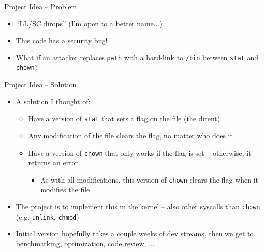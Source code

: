 \documentclass[aspectratio=169]{beamer}
\begin{document}
\begin{frame}[fragile]{Project Idea -- Problem}
	\begin{itemize}
		\item ``LL/SC dirops'' (I'm open to a better name...)
	\end{itemize}

	\begin{example}
		\begin{semiverbatim}
			
		\end{semiverbatim}
	\end{example}

	\begin{itemize}
		\pause
		\item This code has a security bug!
		      \pause
		\item What if an attacker replaces \texttt{path} with a hard-link to \texttt{/bin} between \texttt{stat} and \texttt{chown}?
	\end{itemize}
\end{frame}

\begin{frame}{Project Idea -- Solution}
	\begin{itemize}
		\item A solution I thought of:
		      \begin{itemize}
			      \item Have a version of \texttt{stat} that sets a flag on the file (the dirent)
			      \item Any modification of the file clears the flag, no matter who does it
			      \item Have a version of \texttt{chown} that only works if the flag is set -- otherwise, it returns an error
			            \begin{itemize}
				            \item As with all modifications, this version of \texttt{chown} clears the flag when it modifies the file
			            \end{itemize}
		      \end{itemize}
		\item The project is to implement this in the kernel -- also other syscalls than \texttt{chown} (e.g. \texttt{unlink}, \texttt{chmod})
		\item Initial version hopefully takes a couple weeks of dev streams, then we get to benchmarking, optimization, code review, ...
	\end{itemize}
\end{frame}
\end{document}
